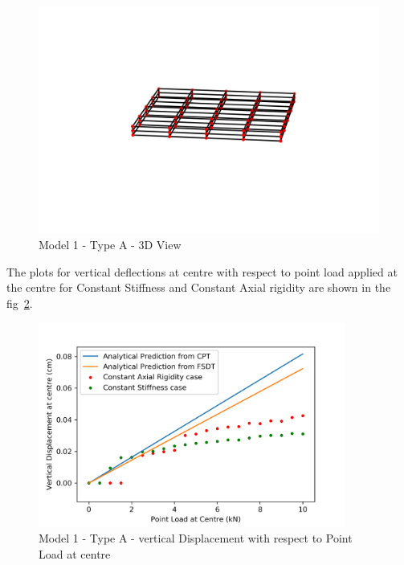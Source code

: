 \begin{figure}[!htbp]
\begin{minipage}{0.3\textwidth}
    \includegraphics[width = 1\textwidth]{Figures/M1_type_a_3D.png}
    \caption{Model 1 - Type A - 3D View}
    \label{fig:M1_a_3D}
\end{minipage}
\end{figure}

The plots for vertical deflections at centre with respect to point load applied at the centre for Constant Stiffness and Constant Axial rigidity are shown in the fig~\ref{fig:M1_a_plt}.

\begin{figure}[!htbp]
    \centering
    \includegraphics[width = 0.9\textwidth]{Figures/M1_a_plt.png}
    \caption{Model 1 - Type A - vertical Displacement with respect to Point Load at centre}
    \label{fig:M1_a_plt}
\end{figure}

